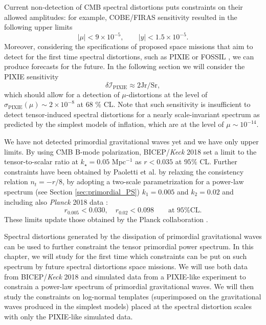 \label{chap:constr}
Current non-detection of CMB spectral distortions puts constraints on their allowed amplitudes: for example, COBE/FIRAS \cite{COBE1996} sensitivity resulted in the following upper limits 
\begin{equation}\label{eq:cobe7firas_sens}
    |\mu|<9\times10^{-5}, \qquad  |y|<1.5\times 10^{-5}.
\end{equation}
Moreover, considering the specifications of proposed space missions that aim to detect for the first time spectral distortions, such as PIXIE \cite{pixie,A_Kogut_2011,Chluba_2021} or FOSSIL \cite{IAS_Fossil}, we can produce forecasts for the future. In the following section we will consider the PIXIE sensitivity \cite{Chluba_2021}
\begin{equation}
    \label{eq:pix_sens} \delta\mathcal I_\text{PIXIE}\approx2 \text{Jr/Sr},
\end{equation}
which should allow for a detection of $\mu$-distortions at the level of $\sigma_\text{PIXIE} (\mu)\sim 2\times10^{-8}$ at 68 \% CL. 
Note that such sensitivity is insufficient to detect tensor-induced spectral distortions for a nearly scale-invariant spectrum as predicted by the simplest models of inflation, which are at the level of $\mu \sim 10^{-14}$.

We have not detected primordial gravitational waves yet and we have only upper limits. By using CMB B-mode polarization, BICEP/\textit{Keck} 2018 \cite{Ade_2021} set a limit to the tensor-to-scalar ratio at $k_\star=0.05$ Mpc$^{-1}$ as $r<0.035$ at $95\%$ CL. Further constraints have been obtained by Paoletti et al. \cite{Paoletti_2022} by relaxing the consistency relation $n_t=-r/8$, by adopting a two-scale parametrization for a power-law spectrum (see  Section \ref{sec:primordial_PS}) $k_1=0.005$ and $k_2=0.02$ and including also \textit{Planck} 2018 data \cite{Planck:2019nip}:
\begin{equation}
    r_{0.005}<0.030,\quad r_{0.02}<0.098\qquad\text{at 95\% CL.}
\end{equation}
These limits update those obtained by the Planck collaboration \cite{Planck:2015sxf,Planck:2018jri}.

Spectral distortions generated by the dissipation of primordial gravitational waves can be used to further constraint the tensor primordial power spectrum. In this chapter, we will study for the first time which constraints can be put on such spectrum by future spectral distortions space missions. We will use both data from BICEP/\textit{Keck} 2018 and simulated data from a PIXIE-like experiment to constrain a power-law spectrum of primordial gravitational waves.
We will then study the constraints on log-normal templates (superimposed on the gravitational waves produced in the simplest models) placed at the spectral distortion scales with only the PIXIE-like simulated data.

